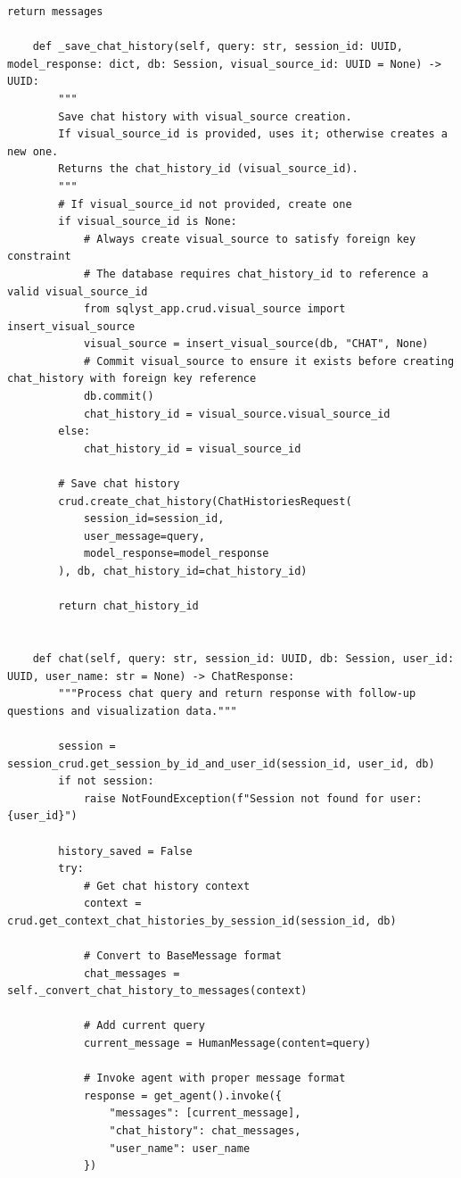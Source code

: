 \begin{lstlisting}[style=python, numbers=none, caption={Text2SQL chat service (\code{text2sql\_service.py})}, label={lst:text2sql-service}]
        return messages

    def _save_chat_history(self, query: str, session_id: UUID, model_response: dict, db: Session, visual_source_id: UUID = None) -> UUID:
        """
        Save chat history with visual_source creation.
        If visual_source_id is provided, uses it; otherwise creates a new one.
        Returns the chat_history_id (visual_source_id).
        """
        # If visual_source_id not provided, create one
        if visual_source_id is None:
            # Always create visual_source to satisfy foreign key constraint
            # The database requires chat_history_id to reference a valid visual_source_id
            from sqlyst_app.crud.visual_source import insert_visual_source
            visual_source = insert_visual_source(db, "CHAT", None)
            # Commit visual_source to ensure it exists before creating chat_history with foreign key reference
            db.commit()
            chat_history_id = visual_source.visual_source_id
        else:
            chat_history_id = visual_source_id

        # Save chat history
        crud.create_chat_history(ChatHistoriesRequest(
            session_id=session_id,
            user_message=query,
            model_response=model_response
        ), db, chat_history_id=chat_history_id)

        return chat_history_id


    def chat(self, query: str, session_id: UUID, db: Session, user_id: UUID, user_name: str = None) -> ChatResponse:
        """Process chat query and return response with follow-up questions and visualization data."""

        session = session_crud.get_session_by_id_and_user_id(session_id, user_id, db)
        if not session:
            raise NotFoundException(f"Session not found for user: {user_id}")

        history_saved = False
        try:
            # Get chat history context
            context = crud.get_context_chat_histories_by_session_id(session_id, db)

            # Convert to BaseMessage format
            chat_messages = self._convert_chat_history_to_messages(context)

            # Add current query
            current_message = HumanMessage(content=query)

            # Invoke agent with proper message format
            response = get_agent().invoke({
                "messages": [current_message],
                "chat_history": chat_messages,
                "user_name": user_name
            })



\end{lstlisting}
